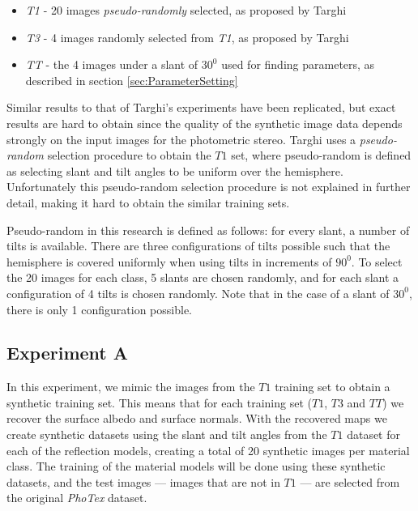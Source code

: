 \begin{itemize}
	\item{\textit{T1} - 20 images {\it pseudo-randomly} selected, as proposed by Targhi}
	\item{\textit{T3} - 4 images randomly selected from \textit{T1}, as proposed by Targhi}
	\item{\textit{TT} - the 4 images under a slant of $30^0$ used for finding parameters, as described in section \ref{sec:ParameterSetting}}
\end{itemize}

Similar results to that of Targhi's experiments have been replicated, but exact results are hard to obtain since the quality of the synthetic image data depends strongly on the input images for the photometric stereo. Targhi uses a {\it pseudo-random} selection procedure to obtain the $T1$ set, where pseudo-random is defined as selecting slant and tilt angles to be uniform over the hemisphere. Unfortunately this pseudo-random selection procedure is not explained in further detail, making it hard to obtain the similar training sets.

Pseudo-random in this research is defined as follows: for every slant, a number of tilts is available. There are three configurations of tilts possible such that the hemisphere is covered uniformly when using tilts in increments of $90^0$. To select the 20 images for each class, 5 slants are chosen randomly, and for each slant a configuration of 4 tilts is chosen randomly. Note that in the case of a slant of $30^0$, there is only 1 configuration possible. 

\subsection{Experiment A}
In this experiment, we mimic the images from the $T1$ training set to obtain a synthetic training set. This means that for each training set ($T1$, $T3$ and $TT$) we recover the surface albedo and surface normals. With the recovered maps we create synthetic datasets using the slant and tilt angles from the $T1$ dataset for each of the reflection models, creating a total of 20 synthetic images per material class. The training of the material models will be done using these synthetic datasets, and the test images --- images that are not in $T1$ --- are selected from the original {\it PhoTex} dataset.

